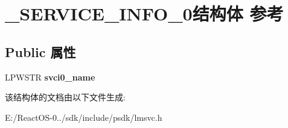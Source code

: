 \hypertarget{struct___s_e_r_v_i_c_e___i_n_f_o__0}{}\section{\+\_\+\+S\+E\+R\+V\+I\+C\+E\+\_\+\+I\+N\+F\+O\+\_\+0结构体 参考}
\label{struct___s_e_r_v_i_c_e___i_n_f_o__0}
\subsection*{Public 属性}
\begin{DoxyCompactItemize}
\item 
\mbox{\label{struct___s_e_r_v_i_c_e___i_n_f_o__0_a2b0f33c4d8071f1810355b629c637763}} 
L\+P\+W\+S\+TR {\bfseries svci0\+\_\+name}
\end{DoxyCompactItemize}


该结构体的文档由以下文件生成\+:\begin{DoxyCompactItemize}
\item 
E\+:/\+React\+O\+S-\/0../sdk/include/psdk/lmsvc.\+h\end{DoxyCompactItemize}
